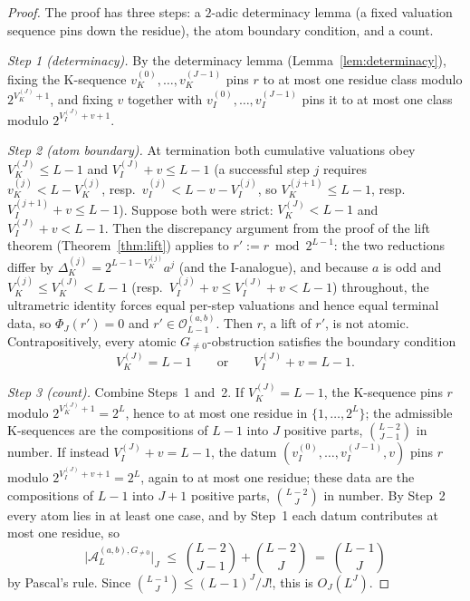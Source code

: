 \documentclass[11pt,reqno]{amsart}
\theoremstyle{plain}
\theoremstyle{definition}
\theoremstyle{remark}
\newcommand{\Obs}{\mathcal{O}}
\newcommand{\Atom}{\mathcal{A}}
\newcommand{\Vk}{V_{K}}
\newcommand{\Vi}{V_{I}}
\newcommand{\vk}{v_{K}}
\newcommand{\vi}{v_{I}}
\begin{document}
\begin{proof}
The proof has three steps: a $2$-adic determinacy lemma (a fixed valuation
sequence pins down the residue), the atom boundary condition, and a count.

\emph{Step 1 (determinacy).} By the determinacy lemma
(Lemma~\ref{lem:determinacy}), fixing the K-sequence
$\vk^{(0)}, \ldots, \vk^{(J-1)}$ pins $r$ to at most one residue class
modulo $2^{\Vk^{(J)}+1}$, and fixing $v$ together with
$\vi^{(0)}, \ldots, \vi^{(J-1)}$ pins it to at most one class modulo
$2^{\Vi^{(J)}+v+1}$.

\emph{Step 2 (atom boundary).} At termination both cumulative valuations
obey $\Vk^{(J)} \le L-1$ and $\Vi^{(J)} + v \le L-1$ (a successful step $j$
requires $\vk^{(j)} < L - \Vk^{(j)}$, resp.\ $\vi^{(j)} < L - v - \Vi^{(j)}$,
so $\Vk^{(j+1)} \le L-1$, resp.\ $\Vi^{(j+1)} + v \le L-1$). Suppose both
were strict: $\Vk^{(J)} < L-1$ and $\Vi^{(J)} + v < L-1$. Then the
discrepancy argument from the proof of the lift theorem
(Theorem~\ref{thm:lift}) applies to $r' := r \bmod 2^{L-1}$: the two
reductions differ by $\Delta_K^{(j)} = 2^{L-1-\Vk^{(j)}} a^j$ (and the
I-analogue), and because $a$ is odd and $\Vk^{(j)} \le \Vk^{(J)} < L-1$
(resp.\ $\Vi^{(j)} + v \le \Vi^{(J)} + v < L-1$) throughout, the ultrametric
identity forces equal per-step valuations and hence equal terminal data, so
$\Phi_J(r') = 0$ and $r' \in \Obs_{L-1}^{(a,b)}$. Then $r$, a lift of $r'$,
is not atomic. Contrapositively, every atomic $G_{\ne 0}$-obstruction
satisfies the boundary condition
\[
\Vk^{(J)} = L-1 \qquad\text{or}\qquad \Vi^{(J)} + v = L-1.
\]

\emph{Step 3 (count).} Combine Steps~1 and~2. If $\Vk^{(J)} = L-1$, the
K-sequence pins $r$ modulo $2^{\Vk^{(J)}+1} = 2^{L}$, hence to at most one
residue in $\{1, \ldots, 2^L\}$; the admissible K-sequences are the
compositions of $L-1$ into $J$ positive parts, $\binom{L-2}{J-1}$ in number.
If instead $\Vi^{(J)} + v = L-1$, the datum $(\vi^{(0)}, \ldots,
\vi^{(J-1)}, v)$ pins $r$ modulo $2^{\Vi^{(J)}+v+1} = 2^{L}$, again to at
most one residue; these data are the compositions of $L-1$ into $J+1$
positive parts, $\binom{L-2}{J}$ in number. By Step~2 every atom lies in at
least one case, and by Step~1 each datum contributes at most one residue, so
\[
\lvert \Atom_L^{(a,b), G_{\ne 0}} \rvert_J
  \;\le\; \binom{L-2}{J-1} + \binom{L-2}{J} \;=\; \binom{L-1}{J}
\]
by Pascal's rule. Since $\binom{L-1}{J} \le (L-1)^J/J!$, this is
$O_J(L^J)$. \qedhere
\end{proof}
\end{document}
